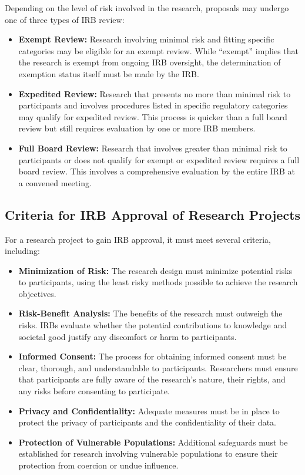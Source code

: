 \documentclass[
]{book}
\providecommand{\tightlist}{%
  \setlength{\itemsep}{0pt}\setlength{\parskip}{0pt}}
\begin{document}
Depending on the level of risk involved in the research, proposals may undergo one of three types of IRB review:

\begin{itemize}
\item
  \textbf{Exempt Review:} Research involving minimal risk and fitting specific categories may be eligible for an exempt review. While ``exempt'' implies that the research is exempt from ongoing IRB oversight, the determination of exemption status itself must be made by the IRB.
\item
  \textbf{Expedited Review:} Research that presents no more than minimal risk to participants and involves procedures listed in specific regulatory categories may qualify for expedited review. This process is quicker than a full board review but still requires evaluation by one or more IRB members.
\item
  \textbf{Full Board Review:} Research that involves greater than minimal risk to participants or does not qualify for exempt or expedited review requires a full board review. This involves a comprehensive evaluation by the entire IRB at a convened meeting.
\end{itemize}

\hypertarget{criteria-for-irb-approval-of-research-projects}{%
\subsection*{Criteria for IRB Approval of Research Projects}\label{criteria-for-irb-approval-of-research-projects}}

For a research project to gain IRB approval, it must meet several criteria, including:

\begin{itemize}
\tightlist
\item
  \textbf{Minimization of Risk:} The research design must minimize potential risks to participants, using the least risky methods possible to achieve the research objectives.
\item
  \textbf{Risk-Benefit Analysis:} The benefits of the research must outweigh the risks. IRBs evaluate whether the potential contributions to knowledge and societal good justify any discomfort or harm to participants.
\item
  \textbf{Informed Consent:} The process for obtaining informed consent must be clear, thorough, and understandable to participants. Researchers must ensure that participants are fully aware of the research's nature, their rights, and any risks before consenting to participate.
\item
  \textbf{Privacy and Confidentiality:} Adequate measures must be in place to protect the privacy of participants and the confidentiality of their data.
\item
  \textbf{Protection of Vulnerable Populations:} Additional safeguards must be established for research involving vulnerable populations to ensure their protection from coercion or undue influence.
\end{itemize}
\end{document}
